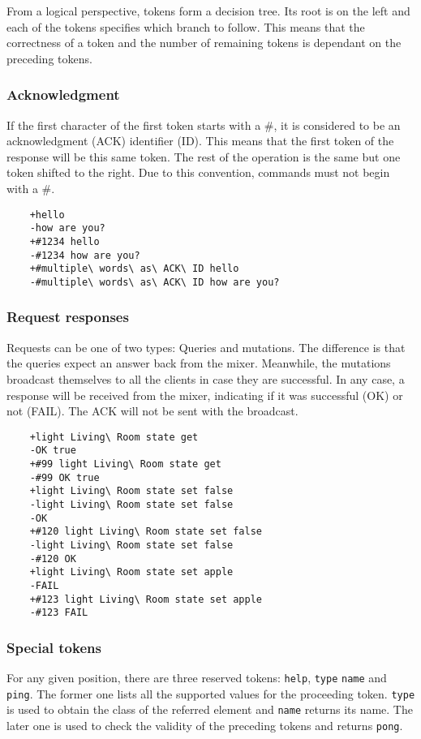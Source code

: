 \documentclass[../main.tex]{subfiles}
\begin{document}
From a logical perspective, tokens form a decision tree. Its root is on the left and each of the tokens specifies which branch to follow. This means that the correctness of a token and the number of remaining tokens is dependant on the preceding tokens.\newline

\subsubsection{Acknowledgment}
If the first character of the first token starts with a \#, it is considered to be an acknowledgment (ACK) identifier (ID). This means that the first token of the response will be this same token. The rest of the operation is the same but one token shifted to the right. Due to this convention, commands must not begin with a \#. 

\begin{lstlisting}
    +hello
    -how are you?
    +#1234 hello
    -#1234 how are you?
    +#multiple\ words\ as\ ACK\ ID hello
    -#multiple\ words\ as\ ACK\ ID how are you?
\end{lstlisting}

\subsubsection{Request responses}
Requests can be one of two types: Queries and mutations. The difference is that the queries expect an answer back from the mixer. Meanwhile, the mutations broadcast themselves to all the clients in case they are successful. In any case, a response will be received from the mixer, indicating if it was successful (OK) or not (FAIL). The ACK will not be sent with the broadcast.

\begin{lstlisting}
    +light Living\ Room state get
    -OK true
    +#99 light Living\ Room state get
    -#99 OK true
    +light Living\ Room state set false
    -light Living\ Room state set false
    -OK
    +#120 light Living\ Room state set false
    -light Living\ Room state set false
    -#120 OK
    +light Living\ Room state set apple
    -FAIL
    +#123 light Living\ Room state set apple
    -#123 FAIL
\end{lstlisting}

\subsubsection{Special tokens}
For any given position, there are three reserved tokens: \texttt{help}, \texttt{type} \texttt{name} and \texttt{ping}. The former one lists all the supported values for the proceeding token. \texttt{type} is used to obtain the class of the referred element and \texttt{name} returns its name. The later one is used to check the validity of the preceding tokens and returns \texttt{pong}.
\end{document}
